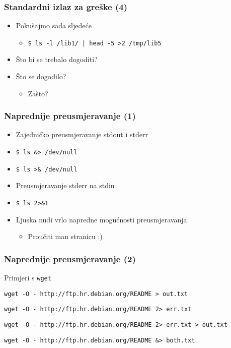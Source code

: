 \documentclass{beamer}
\newcommand{\shell}[1]{\texttt{#1}}
\begin{document}
\begin{frame}[t]
\frametitle{Standardni izlaz za greške (4)}
\begin{itemize}
  \item Pokušajmo sada sljedeće
  \begin{itemize}
    \item[] \shell{\$ ls -l /lib1/ | head -5 >2 /tmp/lib5}
  \end{itemize}
  \item Što bi se trebalo dogoditi?
  \item Što se dogodilo?
  \begin{itemize}
    \item Zašto?
  \end{itemize}
\end{itemize}
\end{frame}

\begin{frame}[t]
\frametitle{Naprednije preusmjeravanje (1)}
\begin{itemize}
  \item Zajedničko preusmjeravanje stdout i stderr
  \item[] \shell{\$ ls \&> /dev/null}
  \item[ili] \shell{\$ ls >\& /dev/null}
  \item Preusmjeravanje stderr na stdin
  \item[] \shell{\$ ls 2>\&1}
\end{itemize}
\begin{itemize}
  \item Ljuska nudi vrlo napredne mogućnosti preusmjeravanja
  \begin{itemize}
    \item Proučiti man stranicu :)
  \end{itemize}
\end{itemize}
\end{frame}

\begin{frame}[t]
\frametitle{Naprednije preusmjeravanje (2)}
\begin{itemize}
	\item Primjeri s \shell{wget} {\footnotesize
	\item[] \shell{wget -O - http://ftp.hr.debian.org/README > out.txt}
	\item[] \shell{wget -O - http://ftp.hr.debian.org/README 2> err.txt}
	\item[] \shell{wget -O - http://ftp.hr.debian.org/README 2> err.txt > out.txt}
	\item[] \shell{wget -O - http://ftp.hr.debian.org/README \&> both.txt} }
\end{itemize}
\end{frame}
\end{document}
